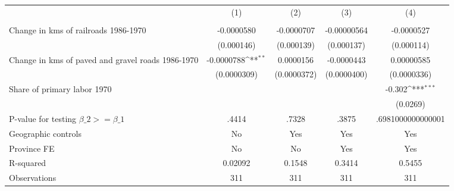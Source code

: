 {
\def\sym#1{\ifmmode^{#1}\else\(^{#1}\)\fi}
\begin{tabular}{l*{4}{c}}
\hline\hline
                &\multicolumn{1}{c}{(1)}&\multicolumn{1}{c}{(2)}&\multicolumn{1}{c}{(3)}&\multicolumn{1}{c}{(4)}\\
                &\multicolumn{1}{c}{}&\multicolumn{1}{c}{}&\multicolumn{1}{c}{}&\multicolumn{1}{c}{}\\
\hline
Change in kms of railroads 1986-1970&-0.0000580         &-0.0000707         &-0.00000564         &-0.0000527         \\
                &(0.000146)         &(0.000139)         &(0.000137)         &(0.000114)         \\
[1em]
Change in kms of paved and gravel roads 1986-1970&-0.0000788\sym{**} &0.0000156         &-0.0000443         &0.00000585         \\
                &(0.0000309)         &(0.0000372)         &(0.0000400)         &(0.0000336)         \\
[1em]
Share of primary labor 1970&                  &                  &                  &   -0.302\sym{***}\\
                &                  &                  &                  & (0.0269)         \\
\hline
P-value for testing $\beta\_{2} >= \beta\_{1}$&    .4414         &    .7328         &    .3875         &.6981000000000001         \\
Geographic controls&       No         &      Yes         &      Yes         &      Yes         \\
Province FE     &       No         &       No         &      Yes         &      Yes         \\
R-squared       &  0.02092         &   0.1548         &   0.3414         &   0.5455         \\
Observations    &      311         &      311         &      311         &      311         \\
\hline\hline
\end{tabular}
}
